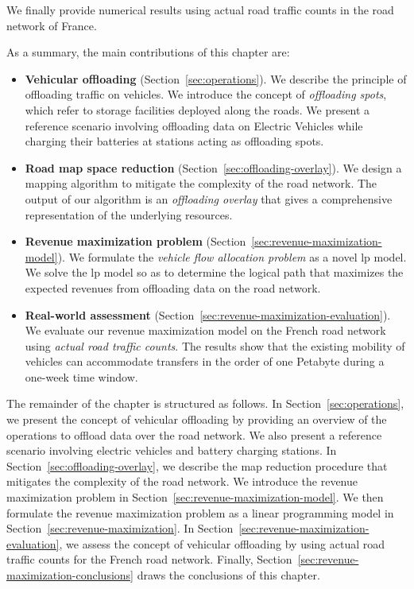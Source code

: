We finally provide numerical results using actual road traffic counts in the road network of France. 

As a summary, the main contributions of this chapter are:

\begin{itemize}

    \item \textbf{Vehicular offloading} (Section~\ref{sec:operations}). We describe the principle of offloading traffic on vehicles. We introduce the concept of \textit{offloading spots}, which refer to storage facilities deployed along the roads. We present a reference scenario involving offloading data on Electric Vehicles while charging their batteries at stations acting as offloading spots.    
    
    \item \textbf{Road map space reduction} (Section~\ref{sec:offloading-overlay}). We design a mapping algorithm to mitigate the complexity of the road network. The output of our algorithm is an \textit{offloading overlay} that gives a comprehensive representation of the underlying resources.
    
    
    \item \textbf{Revenue maximization problem} (Section~\ref{sec:revenue-maximization-model}). We formulate the \textit{vehicle flow allocation problem} as a novel \acrfull{lp} model. We solve the \acrshort{lp} model so as to determine the logical path that maximizes the expected revenues from offloading data on the road network.
     
	\item \textbf{Real-world assessment} (Section~\ref{sec:revenue-maximization-evaluation}). We evaluate our revenue maximization model on the French road network using \textit{actual road traffic counts}. The results show that the existing mobility of vehicles can accommodate transfers in the order of one Petabyte during a one-week time window.

\end{itemize}

The remainder of the chapter is structured as follows. In Section~\ref{sec:operations}, we present the concept of vehicular offloading by providing an overview of the operations to offload data over the road network. We also present a reference scenario involving electric vehicles and battery charging stations. In Section~\ref{sec:offloading-overlay}, we describe the map reduction procedure that mitigates the complexity of the road network. We introduce the revenue maximization problem in Section~\ref{sec:revenue-maximization-model}. We then formulate the revenue maximization problem as a linear programming model in Section~\ref{sec:revenue-maximization}. In Section~\ref{sec:revenue-maximization-evaluation}, we assess the concept of vehicular offloading by using actual road traffic counts for the French road network. Finally, Section~\ref{sec:revenue-maximization-conclusions} draws the conclusions of this chapter.


